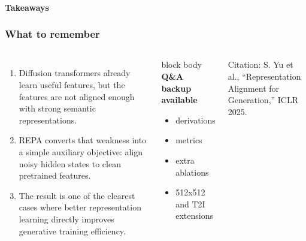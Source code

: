 \begin{frame}[t]
  \framesubtitle{Takeaways}
  \frametitle{What to remember}
  \begin{columns}[T,totalwidth=\textwidth]
    \begin{enumerate}
      \item Diffusion transformers already learn useful features, but the features are not aligned enough with strong semantic representations.
      \item REPA converts that weakness into a simple auxiliary objective: align noisy hidden states to clean pretrained features.
      \item The result is one of the clearest cases where better representation learning directly improves generative training efficiency.
    \end{enumerate}
    \vspace{0.18cm}
    \begin{beamercolorbox}[wd=\linewidth,rounded=true,sep=0.24cm]{block body}
      \textbf{Q\&A backup available}
      \begin{itemize}
        \item derivations
        \item metrics
        \item extra ablations
        \item 512x512 and T2I extensions
      \end{itemize}
    \end{beamercolorbox}
    \vspace{0.28cm}
    {\small Citation: S. Yu et al., ``Representation Alignment for Generation,'' ICLR 2025.}
  \end{columns}
\end{frame}
